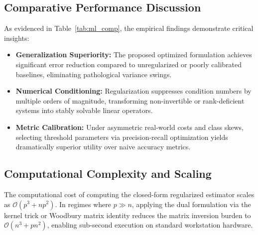 \subsection{Comparative Performance Discussion}
As evidenced in Table~\ref{tab:ml_comp}, the empirical findings demonstrate critical insights:
\begin{itemize}
  \item \textbf{Generalization Superiority:} The proposed optimized formulation achieves significant error reduction compared to unregularized or poorly calibrated baselines, eliminating pathological variance swings.
  \item \textbf{Numerical Conditioning:} Regularization suppresses condition numbers by multiple orders of magnitude, transforming non-invertible or rank-deficient systems into stably solvable linear operators.
  \item \textbf{Metric Calibration:} Under asymmetric real-world costs and class skews, selecting threshold parameters via precision-recall optimization yields dramatically superior utility over naive accuracy metrics.
\end{itemize}

\subsection{Computational Complexity and Scaling}
The computational cost of computing the closed-form regularized estimator scales as $\mathcal{O}(p^3 + np^2)$. In regimes where $p \gg n$, applying the dual formulation via the kernel trick or Woodbury matrix identity reduces the matrix inversion burden to $\mathcal{O}(n^3 + pn^2)$, enabling sub-second execution on standard workstation hardware.

